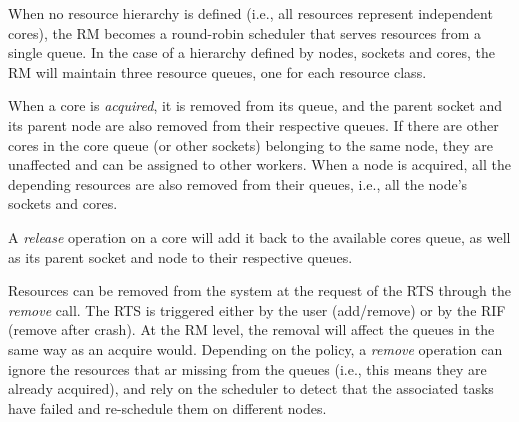 \documentclass[10pt]{article}
\newcommand{\rts}{RTS\xspace}
\newcommand{\rman}{RM\xspace}
\begin{document}
When no resource hierarchy is defined (i.e., all resources represent
independent cores), the \rman becomes a round-robin scheduler that serves
resources from a single queue.
In the case of a hierarchy defined by nodes, sockets and cores, the \rman will
maintain three resource queues, one for each resource class.

When a core is \emph{acquired}, it is removed from its queue, and the parent
socket and its parent node are also removed from their respective queues. If
there are other cores in the core queue  (or other sockets) belonging to the
same node, they are unaffected and can be assigned to other workers.
When a node is acquired, all the depending resources are also removed from their
queues, i.e., all the node's sockets and cores.

A \emph{release} operation on a core will add it back to the available cores
queue, as well as its parent socket and node to their respective queues.

Resources can be removed from the system at the request of the \rts through the
\emph{remove} call.
The \rts is triggered either by the user (add/remove)  or by the RIF (remove
after crash).
At the \rman level, the removal will affect the queues in the same way as an
acquire would.
Depending on the policy, a \emph{remove} operation 
can ignore the resources that ar missing from the queues (i.e., this means they
are already acquired), and rely on the scheduler to detect that the associated
tasks have failed and re-schedule them on different nodes. 
\end{document}
